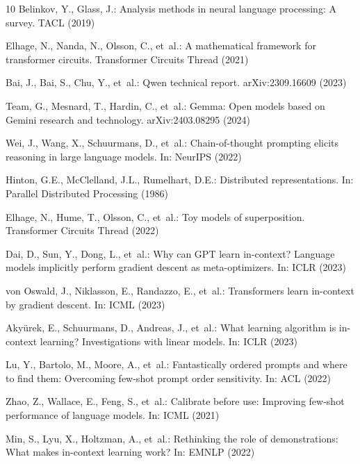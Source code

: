 \documentclass[runningheads]{llncs}
\begin{document}
\begin{thebibliography}{10}
Belinkov, Y., Glass, J.: Analysis methods in neural language processing: A
  survey. TACL (2019)

Elhage, N., Nanda, N., Olsson, C., et~al.: A mathematical framework for
  transformer circuits. Transformer Circuits Thread (2021)

Bai, J., Bai, S., Chu, Y., et~al.: Qwen technical report. arXiv:2309.16609
  (2023)

Team, G., Mesnard, T., Hardin, C., et~al.: Gemma: Open models based on Gemini
  research and technology. arXiv:2403.08295 (2024)

Wei, J., Wang, X., Schuurmans, D., et~al.: Chain-of-thought prompting elicits
  reasoning in large language models. In: NeurIPS (2022)

Hinton, G.E., McClelland, J.L., Rumelhart, D.E.: Distributed representations.
  In: Parallel Distributed Processing (1986)

Elhage, N., Hume, T., Olsson, C., et~al.: Toy models of superposition.
  Transformer Circuits Thread (2022)

Dai, D., Sun, Y., Dong, L., et~al.: Why can GPT learn in-context? Language
  models implicitly perform gradient descent as meta-optimizers. In: ICLR
  (2023)

von Oswald, J., Niklasson, E., Randazzo, E., et~al.: Transformers learn
  in-context by gradient descent. In: ICML (2023)

Aky{\"u}rek, E., Schuurmans, D., Andreas, J., et~al.: What learning algorithm
  is in-context learning? Investigations with linear models. In: ICLR (2023)

Lu, Y., Bartolo, M., Moore, A., et~al.: Fantastically ordered prompts and where
  to find them: Overcoming few-shot prompt order sensitivity. In: ACL (2022)

Zhao, Z., Wallace, E., Feng, S., et~al.: Calibrate before use: Improving
  few-shot performance of language models. In: ICML (2021)

Min, S., Lyu, X., Holtzman, A., et~al.: Rethinking the role of demonstrations:
  What makes in-context learning work? In: EMNLP (2022)

\end{thebibliography}
\end{document}
